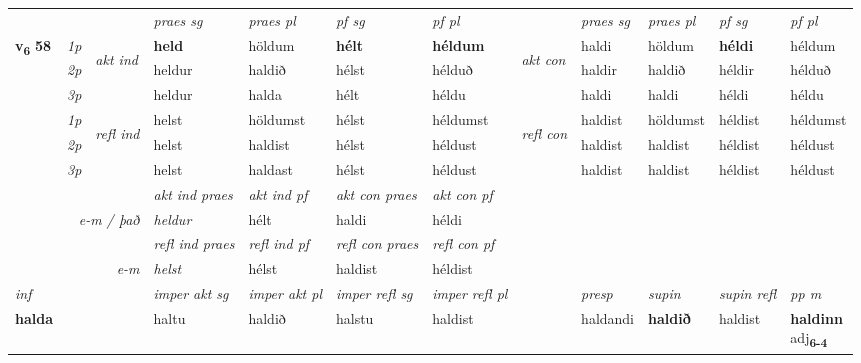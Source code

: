 \begin{longtable}[l]{X>{\footnotesize\itshape}llXXXXlXXXX}
\midrule

\midrule
 & &   & \textit{praes sg}  & \textit{praes pl}    & \textit{ pf sg} & \textit{pf pl} & & \textit{praes sg}  & \textit{praes pl}    & \textit{pf sg} & \textit{pf pl }  \\ \cmidrule{4-7} \cmidrule{9-12}
 \multirow{2}{*}{{{\textbf{v{\textsubscript{6}}} \Large{\textbf{58}}}}}  & 1p & \multirow{3}{*}{\begin{turn}{90}\textit{akt ind}\end{turn}} & \textbf{held} & höldum & \textbf{hélt} & \textbf{héldum} & \multirow{3}{*}{\begin{turn}{90}\textit{akt con}\end{turn}} &haldi & höldum & \textbf{héldi} & héldum\\*
 & 2p &  &  heldur  & haldið & hélst & hélduð & & haldir & haldið & héldir & hélduð \\*
 & 3p &  & heldur & halda & hélt & héldu & & haldi & haldi& héldi & héldu \\*
\cmidrule{4-7} \cmidrule{9-12}
 & 1p & \multirow{3}{*}{\begin{turn}{90}\textit{refl ind}\end{turn}}  & helst & höldumst & hélst & héldumst & \multirow{3}{*}{\begin{turn}{90}\textit{refl con}\end{turn}}  &haldist & höldumst & héldist & héldumst \\*
 & 2p &  & helst & haldist & hélst & héldust & &haldist & haldist & héldist & héldust \\*
 & 3p  & & helst & haldast & hélst & héldust & & haldist & haldist& héldist & héldust \\*
\cmidrule{4-7} \cmidrule{9-12}

   && &  \textit{akt ind praes} & \textit{akt ind pf} & \textit{akt con praes} & \textit{akt con pf} \\*
\multicolumn{3}{r}{\textit{e-m / það}} & heldur & hélt & haldi & héldi \\*

\cmidrule{4-7}
 & && \textit{refl ind praes} & \textit{refl ind pf} & \textit{refl con praes} & \textit{refl con pf} \\*
\multicolumn{3}{r}{\textit{e-m}}& helst & hélst & haldist & héldist \\*

\cmidrule{4-7}
   {\textit{inf}} & &  & \textit{imper akt sg} & \textit{imper akt pl} & \textit{imper refl sg} & \textit{imper refl pl} && \textit{presp} & \textit{supin} & \textit{supin refl} & \textit{pp m} \\*
  {\textbf{halda}} & && haltu  & haldið & halstu & haldist && haldandi &  \textbf{haldið} & haldist & \specialcell{\textbf{haldinn} \\ adj\textbf{\textsubscript{6-4}}} \\*


\end{longtable}
